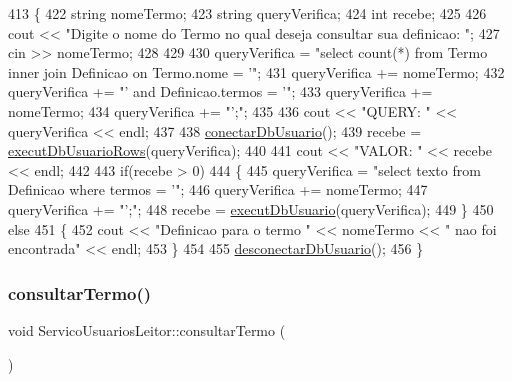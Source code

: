 \begin{DoxyCode}
413     \{
422       \textcolor{keywordtype}{string} nomeTermo;
423       \textcolor{keywordtype}{string} queryVerifica;
424       \textcolor{keywordtype}{int} recebe;
425 
426       cout << \textcolor{stringliteral}{"Digite o nome do Termo no qual deseja consultar sua definicao: "};
427       cin >> nomeTermo;
428 
429 
430       queryVerifica = \textcolor{stringliteral}{"select count(*) from Termo inner join Definicao on Termo.nome = '"};
431       queryVerifica += nomeTermo;
432       queryVerifica += \textcolor{stringliteral}{"' and Definicao.termos = '"};
433       queryVerifica += nomeTermo;
434       queryVerifica += \textcolor{stringliteral}{"';"};
435 
436       cout << \textcolor{stringliteral}{"QUERY: "} <<  queryVerifica << endl;
437 
438       \mbox{\hyperlink{comando_sql_8cpp_a4f89ddcbc4cf8f2587d89f72f8c7900d}{conectarDbUsuario}}();
439       recebe = \mbox{\hyperlink{comando_sql_8cpp_af54952694f2fa7d76f969fb74b853cb9}{executDbUsuarioRows}}(queryVerifica);
440 
441       cout << \textcolor{stringliteral}{"VALOR: "} << recebe << endl;
442 
443       \textcolor{keywordflow}{if}(recebe > 0)
444       \{
445         queryVerifica = \textcolor{stringliteral}{"select texto from Definicao where termos = '"};
446         queryVerifica += nomeTermo;
447         queryVerifica += \textcolor{stringliteral}{"';"};
448         recebe = \mbox{\hyperlink{comando_sql_8cpp_a748197580e7f9acdbf48c78de1f7924b}{executDbUsuario}}(queryVerifica);
449       \}
450       \textcolor{keywordflow}{else}
451       \{
452         cout << \textcolor{stringliteral}{"Definicao para o termo "} << nomeTermo << \textcolor{stringliteral}{" nao foi encontrada"} << endl;
453       \}
454 
455       \mbox{\hyperlink{comando_sql_8cpp_a969be9911913568e30d4ae8963338bc3}{desconectarDbUsuario}}();
456    \}
\end{DoxyCode}
\mbox{\label{class_servico_usuarios_leitor_a79d3a1814ad33930aae0c3a74c879e92}} 
\subsubsection{\texorpdfstring{consultar\+Termo()}{consultarTermo()}}
{\footnotesize\ttfamily void Servico\+Usuarios\+Leitor\+::consultar\+Termo (\begin{DoxyParamCaption}{ }\end{DoxyParamCaption})\hspace{0.3cm}{\ttfamily [virtual]}}

